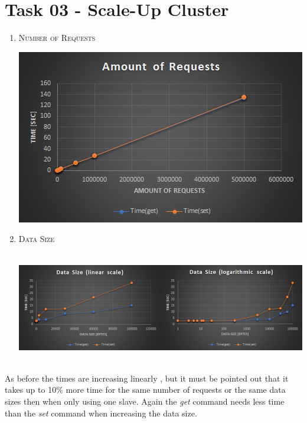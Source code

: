 \documentclass{article}
\begin{document}
	\newpage
	
	\section*{Task 03 - Scale-Up Cluster}
	\begin{adjustwidth}{2em}{2em}
		\begin{enumerate}[\tiny\textbullet]
			\item \textsc{Number of Requests}
			\begin{center}
				\includegraphics[scale=0.6]{Task_03_Requests.png}
			\end{center}
			\item \textsc{Data Size}
			\begin{adjustwidth}{-3em}{}
				\hfill \\
				\includegraphics[scale=0.6]{Task_03_DataSize.png}
			\end{adjustwidth}
		\end{enumerate}
		\hfill \\
		As before the times are increasing linearly , but it must be pointed out that it takes up to 10\% more time for the same number of requests or the same data sizes then when only using one slave. Again the \textit{get} command needs less time than the \textit{set} command when increasing the data size.
	\end{adjustwidth}
	
\end{document}

